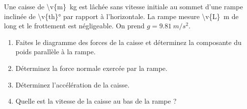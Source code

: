Une caisse de \qty{\v{m}}{kg} est lâchée sans vitesse initiale au sommet d'une rampe inclinée de \ang{\v{th}} par rapport à l'horizontale. La rampe mesure \qty{\v{L}}{m} de long et le frottement est négligeable. On prend $g = \qty{9.81}{m/s^2}$.

\begin{center}
\end{center}

\begin{enumerate}[label=\alph*)]
    \item Faites le diagramme des forces de la caisse et déterminez la composante du poids parallèle à la rampe.
    \item Déterminez la force normale exercée par la rampe.
    \item Déterminez l'accélération de la caisse.
    \item Quelle est la vitesse de la caisse au bas de la rampe ?
\end{enumerate}
